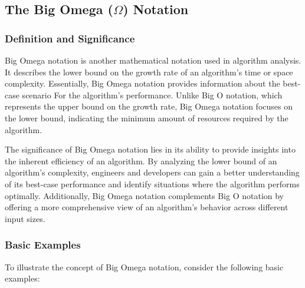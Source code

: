 \documentclass[12pt]{book} %
\begin{document}
\subsection{The Big Omega (\(\Omega\)) Notation}

\subsubsection{Definition and Significance}

Big Omega notation is another mathematical notation used in algorithm analysis. It describes the lower bound on the growth rate of an algorithm's time or space complexity. Essentially, Big Omega notation provides information about the best-case scenario For the algorithm's performance. Unlike Big O notation, which represents the upper bound on the growth rate, Big Omega notation focuses on the lower bound, indicating the minimum amount of resources required by the algorithm.

The significance of Big Omega notation lies in its ability to provide insights into the inherent efficiency of an algorithm. By analyzing the lower bound of an algorithm's complexity, engineers and developers can gain a better understanding of its best-case performance and identify situations where the algorithm performs optimally. Additionally, Big Omega notation complements Big O notation by offering a more comprehensive view of an algorithm's behavior across different input sizes.

\subsubsection{Basic Examples}

To illustrate the concept of Big Omega notation, consider the following basic examples:
\end{document}
